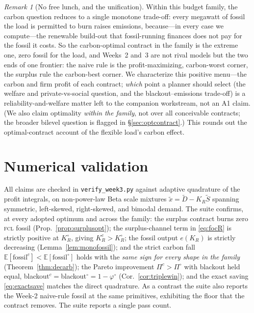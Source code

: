 \documentclass[11pt,reqno]{amsart}
\theoremstyle{plain}
\theoremstyle{definition}
\theoremstyle{remark}
\newtheorem{remark}{Remark}
\newcommand{\KR}{K_R}
\newcommand{\KRc}{K_R^{c}}
\newcommand{\KRo}{K_R^{\circ}}
\newcommand{\E}{\mathbb{E}}
\newcommand{\fossil}{\mathrm{fossil}}
\begin{document}
\begin{remark}[No free lunch, and the unification]
Within this budget family, the carbon question reduces to a single monotone trade-off:
every megawatt of fossil the load is permitted to burn raises emissions, because---in
every case we compute---the renewable build-out that fossil-running finances does not
pay for the fossil it costs. So the carbon-optimal contract in the family is the extreme
one, zero fossil for the load, and Weeks~2 and~3 are not rival models but the two ends of
one frontier: the naive rule is the profit-maximizing, carbon-worst corner, the surplus
rule the carbon-best corner. We characterize this positive menu---the carbon and firm
profit of each contract; \emph{which} point a planner should select (the welfare and
private-vs-social question, and the blackout--emissions trade-off) is a
reliability-and-welfare matter left to the companion workstream, not an A1 claim. (We
also claim optimality \emph{within the family}, not over all conceivable contracts; the
broader bilevel question is flagged in \S\ref{sec:optcontract}.) This rounds out the
optimal-contract account of the flexible load's carbon effect.
\end{remark}

\section{Numerical validation}\label{sec:num}

All claims are checked in \texttt{verify\_week3.py} against adaptive quadrature of the
profit integrals, on non-power-law Beta scale mixtures
$\tilde x=\tilde D-\KR\tilde S$ spanning symmetric, left-skewed, right-skewed, and
bimodal demand. The suite confirms, at every adopted optimum and across the family:
the surplus contract burns zero \textsc{fcl} fossil (Prop.~\ref{prop:surplusopt}); the
surplus-channel term in \eqref{eq:focR} is strictly positive at $\KRo$, giving
$\KRc>\KRo$; the fossil output $e(\KR)$ is strictly decreasing
(Lemma~\ref{lem:monofossil}); and the strict carbon fall
$\E[\fossil^{c}]<\E[\fossil^{\circ}]$ holds with the \emph{same sign for every shape in
the family} (Theorem~\ref{thm:decarb}); the Pareto improvement $\Pi^{c}>\Pi^{\circ}$
with blackout held equal, blackout$^{c}=$blackout$^{\circ}=1-\varphi^{\circ}$
(Cor.~\ref{cor:triplewin}); and the exact saving \eqref{eq:exactsave} matches the direct
quadrature. As a contrast the suite also
reports the Week-2 naive-rule fossil at the same primitives, exhibiting the floor that
the contract removes. The suite reports a single pass count.
\end{document}

